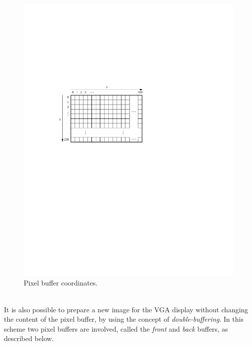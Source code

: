 \documentclass[epsfig,10pt,fullpage]{article}
\begin{document}
\begin{figure}[t]
   \begin{center}
       \includegraphics{figures/fig_video_coord.pdf}
   \end{center}
   \caption{Pixel buffer coordinates.}
	\label{fig:video_coord}
\end{figure}

~\\
\noindent
It is also possible to prepare a new image for the VGA display without changing the content 
of the pixel buffer, by using the concept of {\it double-buffering}.  In this scheme two 
pixel buffers are involved, called the {\it front} and {\it back} buffers, as described below.
\end{document}
